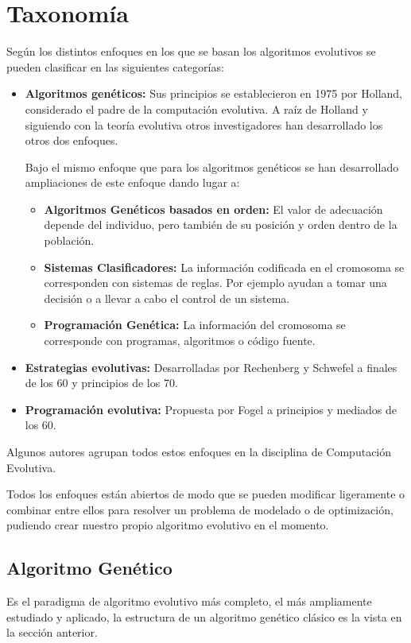 \documentclass[12pt, twoside, openright]{report} %
\begin{document}
\section{Taxonomía}
Según los distintos enfoques en los que se basan los algoritmos evolutivos se pueden clasificar en las siguientes categorías:
\begin{itemize}
	\item \textbf{Algoritmos genéticos:} Sus principios se establecieron en 1975 por Holland, considerado el padre de la computación evolutiva. A raíz de Holland y siguiendo con la teoría evolutiva otros investigadores han desarrollado los otros dos enfoques.
	      
	      Bajo el mismo enfoque que para los algoritmos genéticos se han desarrollado ampliaciones de este enfoque dando lugar a:
	      \begin{itemize}
		      \item \textbf{Algoritmos Genéticos basados en orden:} El valor de adecuación depende del individuo, pero también de su posición y orden dentro de la población.
		      \item \textbf{Sistemas Clasificadores:} La información codificada en el cromosoma se corresponden con sistemas de reglas. Por ejemplo ayudan a tomar una decisión o a llevar a cabo el control de un sistema.
		      \item \textbf{Programación Genética:} La información del cromosoma se corresponde con programas, algoritmos o código fuente.
	      \end{itemize}
	\item \textbf{Estrategias evolutivas:} Desarrolladas por Rechenberg y Schwefel a finales de los 60 y principios de los 70.
	\item \textbf{Programación evolutiva:} Propuesta por Fogel a principios y mediados de los 60.
\end{itemize}

Algunos autores agrupan todos estos enfoques en la disciplina de Computación Evolutiva.

Todos los enfoques están abiertos de modo que se pueden modificar ligeramente o combinar entre ellos para resolver un problema de modelado o de optimización, pudiendo crear nuestro propio algoritmo evolutivo en el momento.

\subsection{Algoritmo Genético}
Es el paradigma de algoritmo evolutivo más completo, el más ampliamente estudiado y aplicado, la estructura de un algoritmo genético clásico es la vista en la sección anterior.
\end{document}
